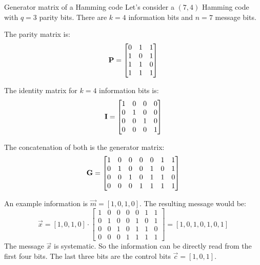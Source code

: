 \begin{refsection}
\begin{example}{Generator matrix of a Hamming code}
	Let's consider a $(7,4)$ Hamming code with $q = 3$ parity bits. There are $k = 4$ information bits and $n = 7$ message bits.
	
	The parity matrix is:
	\begin{equation}
		\bm{\mathrm{P}} = \left[\begin{matrix}
			0 & 1 & 1 \\
			1 & 0 & 1 \\
			1 & 1 & 0 \\
			1 & 1 & 1
		\end{matrix}\right]
	\end{equation}

	The identity matrix for $k = 4$ information bits is:
	\begin{equation}
		\bm{\mathrm{\mathrm{I}}} = \left[\begin{matrix}
			1 & 0 & 0 & 0 \\
			0 & 1 & 0 & 0 \\
			0 & 0 & 1 & 0 \\
			0 & 0 & 0 & 1
		\end{matrix}\right]
	\end{equation}

	The concatenation of both is the generator matrix:
	\begin{equation}
		\bm{\mathrm{G}} = \left[\begin{matrix}
			1 & 0 & 0 & 0 & 0 & 1 & 1 \\
			0 & 1 & 0 & 0 & 1 & 0 & 1 \\
			0 & 0 & 1 & 0 & 1 & 1 & 0 \\
			0 & 0 & 0 & 1 & 1 & 1 & 1
		\end{matrix}\right]
	\end{equation}

	An example information is $\vec{m} = \left[1, 0, 1, 0\right]$. The resulting message would be:
	\begin{equation}
		\vec{x} = \left[1, 0, 1, 0\right] \cdot \left[\begin{matrix}
			1 & 0 & 0 & 0 & 0 & 1 & 1 \\
			0 & 1 & 0 & 0 & 1 & 0 & 1 \\
			0 & 0 & 1 & 0 & 1 & 1 & 0 \\
			0 & 0 & 0 & 1 & 1 & 1 & 1
		\end{matrix}\right] = \left[1, 0, 1, 0, 1, 0, 1\right]
	\end{equation}
	The message $\vec{x}$ is systematic. So the information can be directly read from the first four bits. The last three bits are the control bits $\vec{c} = \left[1, 0, 1\right]$.
	

\end{example}
\end{refsection}
